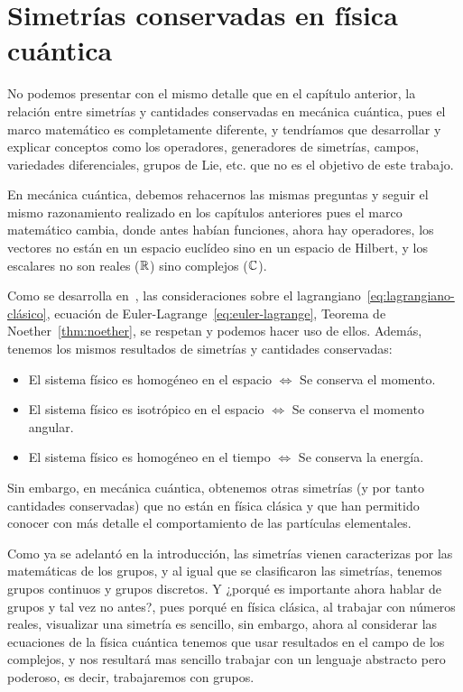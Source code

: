 \section{Simetrías conservadas en física cuántica}\label{sec:simetrías-y-cantidades-conservadas-en-física-cuántica}

No podemos presentar con el mismo detalle que en el capítulo anterior, la relación entre simetrías y cantidades conservadas en mecánica cuántica, pues el marco matemático es completamente diferente, y tendríamos que desarrollar y explicar conceptos como los operadores, generadores de simetrías, campos, variedades diferenciales, grupos de Lie, etc. que no es el objetivo de este trabajo.

En mecánica cuántica, debemos rehacernos las mismas preguntas y seguir el mismo razonamiento realizado en los capítulos anteriores pues el marco matemático cambia, donde antes habían funciones, ahora hay operadores, los vectores no están en un espacio euclídeo sino en un espacio de Hilbert, y los escalares no son reales ($\mathbb{R}$) sino complejos ($\mathbb{C}$).

Como se desarrolla en~\cite{QMS}, las consideraciones sobre el lagrangiano~\eqref{eq:lagrangiano-clásico}, ecuación de Euler-Lagrange~\eqref{eq:euler-lagrange}, Teorema de Noether~\eqref{thm:noether}, se respetan y podemos hacer uso de ellos.
Además, tenemos los mismos resultados de simetrías y cantidades conservadas:

\begin{itemize}
	\item El sistema físico es homogéneo en el espacio $\Leftrightarrow$ Se conserva el momento.
	\item El sistema físico es isotrópico en el espacio $\Leftrightarrow$ Se conserva el momento angular.
	\item El sistema físico es homogéneo en el tiempo $\Leftrightarrow$ Se conserva la energía.
\end{itemize}

Sin embargo, en mecánica cuántica, obtenemos otras simetrías (y por tanto cantidades conservadas) que no están en física clásica y que han permitido conocer con más detalle el comportamiento de las partículas elementales.

Como ya se adelantó en la introducción, las simetrías vienen caracterizas por las matemáticas de los grupos, y al igual que se clasificaron las simetrías, tenemos grupos continuos y grupos discretos.
Y ¿porqué es importante ahora hablar de grupos y tal vez no antes?, pues porqué en física clásica, al trabajar con números reales, visualizar una simetría es sencillo, sin embargo, ahora al considerar las ecuaciones de la física cuántica tenemos que usar resultados en el campo de los complejos, y nos resultará mas sencillo trabajar con un lenguaje abstracto pero poderoso, es decir, trabajaremos con grupos.

